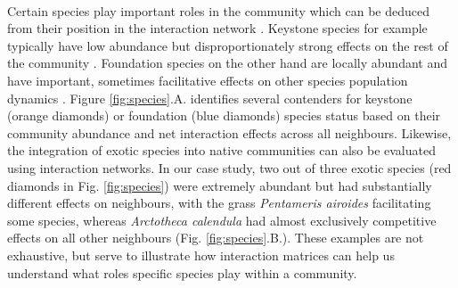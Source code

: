 \documentclass[a4,12pt]{article}
\begin{document}
\begin{itemize}
    \paragraph{}
    Certain species play important roles in the community which can be deduced from their position in the interaction network \parencite{Cirtwill2018a}. Keystone species for example typically have low abundance but disproportionately strong effects on the rest of the community \parencite{Power1996}. Foundation species on the other hand are locally abundant and have important, sometimes facilitative effects on other species population dynamics \parencite{Ellison2019}. Figure \ref{fig:species}.A. identifies several contenders for keystone (orange diamonds) or foundation (blue diamonds) species status based on their community abundance and net interaction effects across all neighbours. Likewise, the integration of exotic species into native communities can also be evaluated using interaction networks. In our case study, two out of three exotic species (red diamonds in Fig. \ref{fig:species}) were extremely abundant but had substantially different effects on neighbours, with the grass \textit{Pentameris airoides} facilitating some species, whereas \textit{Arctotheca calendula} had almost exclusively competitive effects on all other neighbours (Fig. \ref{fig:species}.B.). These examples are not exhaustive, but serve to illustrate how interaction matrices can help us understand what roles specific species play within a community. 




\end{itemize}
\end{document}
